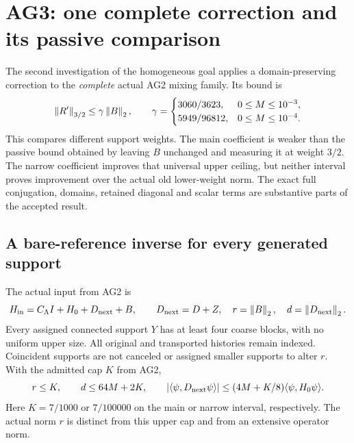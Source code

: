 \section{AG3: one complete correction and its passive comparison\workstar}
The second investigation of the homogeneous goal applies a domain-preserving correction to the \emph{complete} actual AG2 mixing family. Its bound is
\begin{equation}
 \left\lVert R'\right\rVert_{3/2}\le\gamma\left\lVert B\right\rVert_2,
 \qquad
 \gamma=\begin{cases}3060/3623,&0\le M\le10^{-3},\\
 5949/96812,&0\le M\le10^{-4}.
 \end{cases}
 \label{eq:ag3-headline}
\end{equation}
This compares different support weights. The main coefficient is weaker than the passive bound obtained by leaving $B$ unchanged and measuring it at weight $3/2$. The narrow coefficient improves that universal upper ceiling, but neither interval proves improvement over the actual old lower-weight norm. The exact full conjugation, domains, retained diagonal and scalar terms are substantive parts of the accepted result.

\subsection{A bare-reference inverse for every generated support}
The actual input from AG2 is
\begin{equation}
 H_{\rm in}=C_\Lambda I+H_0+D_{\rm next}+B,\qquad
 D_{\rm next}=D+Z,\quad r=\left\lVert B\right\rVert_2,\quad d=\left\lVert D_{\rm next}\right\rVert_2.
 \label{eq:ag3-input}
\end{equation}
Every assigned connected support $Y$ has at least four coarse blocks, with no uniform upper size. All original and transported histories remain indexed. Coincident supports are not canceled or assigned smaller supports to alter $r$. With the admitted cap $K$ from AG2,
\begin{equation}
 r\le K,\qquad d\le64M+2K,\qquad
 \left|\langle\psi,D_{\rm next}\psi\rangle\right|
 \le(4M+K/8)\langle\psi,H_0\psi\rangle.
 \label{eq:ag3-input-budgets}
\end{equation}
Here $K=7/1000$ or $7/100000$ on the main or narrow interval, respectively. The actual norm $r$ is distinct from this upper cap and from an extensive operator norm.

